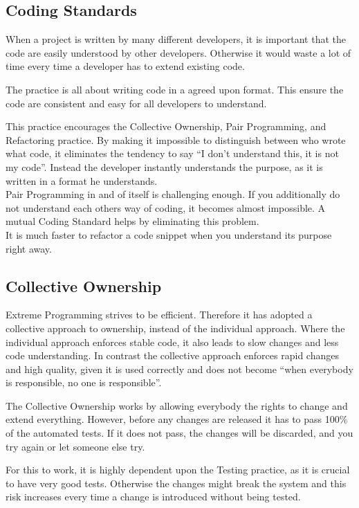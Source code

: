 \subsection{Coding Standards}
When a project is written by many different developers, it is important that the code are easily understood by other developers.
Otherwise it would waste a lot of time every time a developer has to extend existing code.

The practice is all about writing code in a agreed upon format.
This ensure the code are consistent and easy for all developers to understand.

This practice encourages the Collective Ownership, Pair Programming, and Refactoring practice.
By making it impossible to distinguish between who wrote what code, it eliminates the tendency to say ``I don't understand this, it is not my code”. Instead the developer instantly understands the purpose, as it is written in a format he understands.\\
Pair Programming in and of itself is challenging enough. If you additionally do not understand each others way of coding, it becomes almost impossible. 
A mutual Coding Standard helps by eliminating this problem.\\
It is much faster to refactor a code snippet when you understand its purpose right away.

\subsection{Collective Ownership}
Extreme Programming strives to be efficient.
Therefore it has adopted a collective approach to ownership, instead of the individual approach.
Where the individual approach enforces stable code, it also leads to slow changes and less code understanding.
In contrast the collective approach enforces rapid changes and high quality, given it is used correctly and does not become ``when everybody is responsible, no one is responsible”.

The Collective Ownership works by allowing everybody the rights to change and extend everything.
However, before any changes are released it has to pass 100\% of the automated tests.
If it does not pass, the changes will be discarded, and you try again or let someone else try.

For this to work, it is highly dependent upon the Testing practice, as it is crucial to have very good tests.
Otherwise the changes might break the system and this risk increases every time a change is introduced without being tested.


